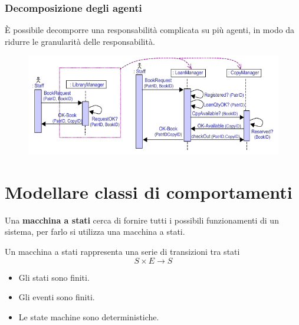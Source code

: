 \subsubsection{Decomposizione degli agenti}
È possibile decomporre una responsabilità complicata su più agenti, in modo da
ridurre le granularità delle responsabilità.
\begin{figure}[H]
    \centering
    \includegraphics[scale=0.5]{img/agent-dec.png}
\end{figure}
\section{Modellare classi di comportamenti}
Una \textbf{macchina a stati} cerca di fornire tutti i possibili funzionamenti 
di un sistema, per farlo si utilizza una macchina a stati.

Un macchina a stati rappresenta una serie di transizioni tra stati
\[
S \times E \to S
\]
\begin{itemize}
    \item Gli stati sono finiti.
    \item Gli eventi sono finiti.
    \item Le state machine sono deterministiche.
\end{itemize}
\begin{figure}[H]
    \centering 
\end{figure}
